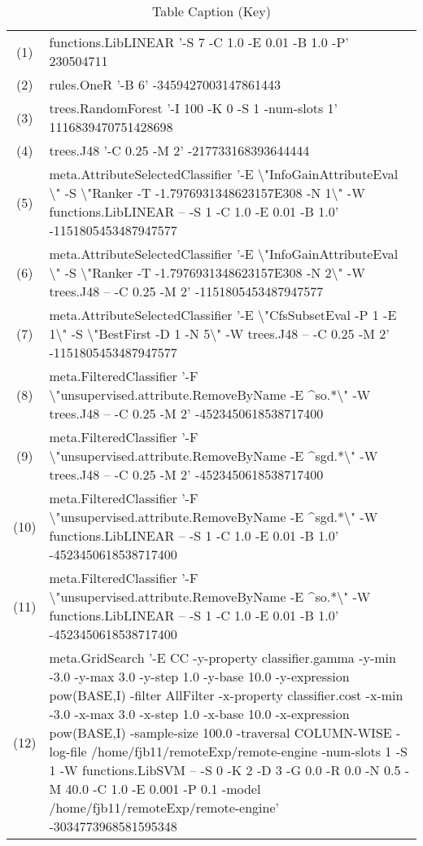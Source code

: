 \begin{table}[thb]
\caption{\label{labelname}Table Caption (Key)}
\scriptsize
{\centering
\begin{tabular}{cl}\\
(1) & functions.LibLINEAR '-S 7 -C 1.0 -E 0.01 -B 1.0 -P' 230504711 \\
(2) & rules.OneR '-B 6' -3459427003147861443 \\
(3) & trees.RandomForest '-I 100 -K 0 -S 1 -num-slots 1' 1116839470751428698 \\
(4) & trees.J48 '-C 0.25 -M 2' -217733168393644444 \\
(5) & meta.AttributeSelectedClassifier '-E \textbackslash"InfoGainAttributeEval \textbackslash" -S \textbackslash"Ranker -T -1.7976931348623157E308 -N 1\textbackslash" -W functions.LibLINEAR -- -S 1 -C 1.0 -E 0.01 -B 1.0' -1151805453487947577 \\
(6) & meta.AttributeSelectedClassifier '-E \textbackslash"InfoGainAttributeEval \textbackslash" -S \textbackslash"Ranker -T -1.7976931348623157E308 -N 2\textbackslash" -W trees.J48 -- -C 0.25 -M 2' -1151805453487947577 \\
(7) & meta.AttributeSelectedClassifier '-E \textbackslash"CfsSubsetEval -P 1 -E 1\textbackslash" -S \textbackslash"BestFirst -D 1 -N 5\textbackslash" -W trees.J48 -- -C 0.25 -M 2' -1151805453487947577 \\
(8) & meta.FilteredClassifier '-F \textbackslash"unsupervised.attribute.RemoveByName -E ^so.*\textbackslash" -W trees.J48 -- -C 0.25 -M 2' -4523450618538717400 \\
(9) & meta.FilteredClassifier '-F \textbackslash"unsupervised.attribute.RemoveByName -E ^sgd.*\textbackslash" -W trees.J48 -- -C 0.25 -M 2' -4523450618538717400 \\
(10) & meta.FilteredClassifier '-F \textbackslash"unsupervised.attribute.RemoveByName -E ^sgd.*\textbackslash" -W functions.LibLINEAR -- -S 1 -C 1.0 -E 0.01 -B 1.0' -4523450618538717400 \\
(11) & meta.FilteredClassifier '-F \textbackslash"unsupervised.attribute.RemoveByName -E ^so.*\textbackslash" -W functions.LibLINEAR -- -S 1 -C 1.0 -E 0.01 -B 1.0' -4523450618538717400 \\
(12) & meta.GridSearch '-E CC -y-property classifier.gamma -y-min -3.0 -y-max 3.0 -y-step 1.0 -y-base 10.0 -y-expression pow(BASE,I) -filter AllFilter -x-property classifier.cost -x-min -3.0 -x-max 3.0 -x-step 1.0 -x-base 10.0 -x-expression pow(BASE,I) -sample-size 100.0 -traversal COLUMN-WISE -log-file /home/fjb11/remoteExp/remote-engine -num-slots 1 -S 1 -W functions.LibSVM -- -S 0 -K 2 -D 3 -G 0.0 -R 0.0 -N 0.5 -M 40.0 -C 1.0 -E 0.001 -P 0.1 -model /home/fjb11/remoteExp/remote-engine' -3034773968581595348 \\

\end{tabular}}
\end{table}
